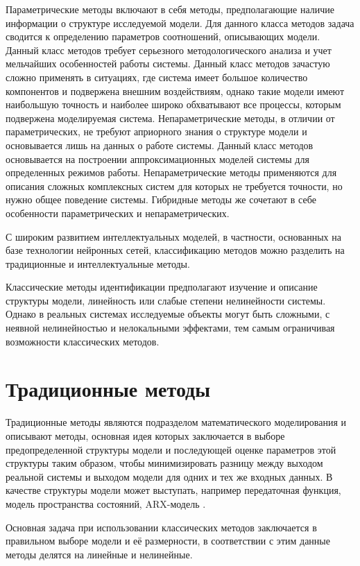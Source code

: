 Параметрические методы включают в себя методы, предполагающие наличие
информации о структуре исследуемой модели. Для данного класса методов задача
сводится к определению параметров соотношений, описывающих модели. Данный класс
методов требует серьезного методологического анализа и учет мельчайших
особенностей работы системы. Данный класс методов зачастую сложно применять в
ситуациях, где система имеет большое количество компонентов и подвержена
внешним воздействиям, однако такие модели имеют наибольшую точность и наиболее
широко обхватывают все процессы, которым подвержена моделируемая система.
Непараметрические методы, в отличии от параметрических,
не требуют априорного знания о структуре модели и основывается лишь на данных о
работе системы. Данный класс методов основывается на построении
аппроксимационных моделей системы для определенных режимов работы.
Непараметрические методы применяются для описания сложных комплексных систем
для которых не требуется точности, но нужно общее поведение системы. Гибридные
методы же сочетают в себе особенности параметрических и непараметрических. 

С широким развитием интеллектуальных моделей, в частности, основанных на базе
технологии нейронных сетей, классификацию методов можно разделить на
традиционные и интеллектуальные методы.

Классические методы идентификации предполагают изучение и описание структуры
модели, линейность или слабые степени нелинейности системы. Однако в реальных
системах исследуемые объекты могут быть сложными, с неявной нелинейностью и
нелокальными эффектами, тем самым ограничивая возможности классических методов. 

\section{Традиционные методы}

Традиционные методы являются подразделом математического моделирования и
описывают методы, основная идея которых заключается в выборе предопределенной
структуры модели и последующей оценке
параметров этой структуры таким образом, чтобы минимизировать разницу между
выходом реальной системы и выходом модели для одних и тех же входных данных.
В качестве структуры модели может выступать, например передаточная функция,
модель пространства состояний, ARX-модель . 

Основная задача при использовании классических методов заключается в правильном
выборе модели и её размерности, в соответствии с этим данные методы делятся на
линейные и нелинейные.

